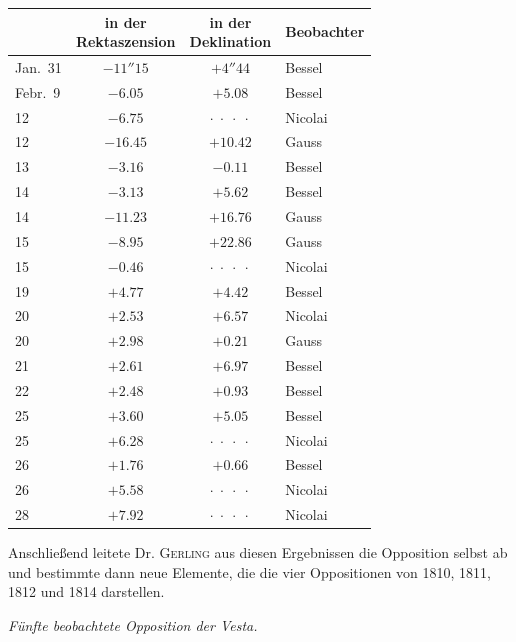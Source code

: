 \begin{center}\fontsize{10}{12}\selectfont\setlength{\tabcolsep}{6pt}\renewcommand{\arraystretch}{1.15}\begin{tabular}{l|c|c|l}
& \shortstack{in der\\Rektaszension} & \shortstack{in der\\Deklination} & Beobachter \\
\hline
Jan.\ 31 & $-11''15$ & $+4''44$  & Bessel \\
Febr.\ 9 & $-6.05$   & $+5.08$   & Bessel \\
12       & $-6.75$   & $\cdot\;\cdot\;\cdot\;\cdot$ & Nicolai \\
12       & $-16.45$  & $+10.42$  & Gauss \\
13       & $-3.16$   & $-0.11$   & Bessel \\
14       & $-3.13$   & $+5.62$   & Bessel \\
14       & $-11.23$  & $+16.76$  & Gauss \\
15       & $-8.95$   & $+22.86$  & Gauss \\
15       & $-0.46$   & $\cdot\;\cdot\;\cdot\;\cdot$ & Nicolai \\
19       & $+4.77$   & $+4.42$   & Bessel \\
20       & $+2.53$   & $+6.57$   & Nicolai \\
20       & $+2.98$   & $+0.21$   & Gauss \\
21       & $+2.61$   & $+6.97$   & Bessel \\
22       & $+2.48$   & $+0.93$   & Bessel \\
25       & $+3.60$   & $+5.05$   & Bessel \\
25       & $+6.28$   & $\cdot\;\cdot\;\cdot\;\cdot$ & Nicolai \\
26       & $+1.76$   & $+0.66$   & Bessel \\
26       & $+5.58$   & $\cdot\;\cdot\;\cdot\;\cdot$ & Nicolai \\
28       & $+7.92$   & $\cdot\;\cdot\;\cdot\;\cdot$ & Nicolai \\
\end{tabular}\end{center}

\par\indent Anschließend leitete Dr. \textsc{Gerling} aus diesen Ergebnissen die Opposition selbst ab und bestimmte dann neue Elemente, die die vier Oppositionen von 1810, 1811, 1812 und 1814 darstellen.

\emph{Fünfte beobachtete Opposition der Vesta.}

